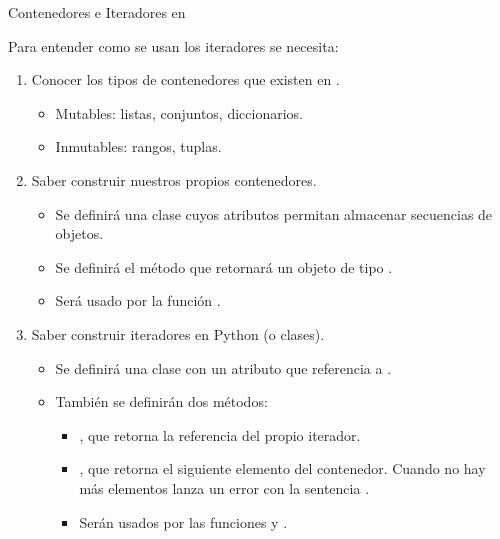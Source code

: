 \documentclass[10pt,envcountsect,spanish]{beamer}
\begin{document}








\begin{frame}[fragile]{Contenedores e Iteradores en }

\noindent Para entender como se usan los iteradores se necesita:

\begin{enumerate}[leftmargin=-.1in, rightmargin=-.3in]%

\item Conocer los tipos de contenedores que existen en .

\begin{itemize}[leftmargin=0.2in, rightmargin=-.3in]%
\item Mutables: listas, conjuntos, diccionarios.
\item Inmutables: rangos, tuplas.
\end{itemize}

\item Saber construir nuestros propios contenedores.

\begin{itemize}[leftmargin=0.2in, rightmargin=-.3in]%
\item Se definirá una clase  cuyos atributos permitan almacenar secuencias de objetos.
\item Se definirá el método  que retornará un objeto de tipo .
\item Será usado por la función .
\end{itemize}


\item Saber construir iteradores en Python (o clases).

\begin{itemize}[leftmargin=0.2in, rightmargin=-.3in]%
\item Se definirá una clase  con un atributo que referencia a .
\item También se definirán dos métodos:
	\begin{itemize}
	\item {}, que retorna la referencia del propio iterador.
	\item {}, que retorna el siguiente elemento del contenedor. Cuando no hay más elementos lanza un error con la sentencia .
	\item Serán usados por las funciones  y .
	\end{itemize}
\end{itemize}


\end{enumerate}
\end{frame}
\end{document}
